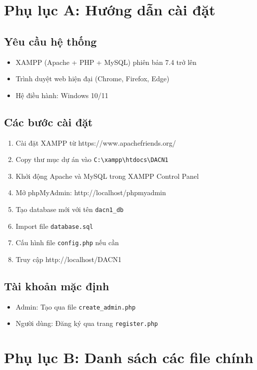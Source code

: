 \documentclass[a4paper,13pt]{extreport}
\begin{document}
\section*{Phụ lục A: Hướng dẫn cài đặt}

\subsection*{Yêu cầu hệ thống}
\begin{itemize}
    \item XAMPP (Apache + PHP + MySQL) phiên bản 7.4 trở lên
    \item Trình duyệt web hiện đại (Chrome, Firefox, Edge)
    \item Hệ điều hành: Windows 10/11
\end{itemize}

\subsection*{Các bước cài đặt}
\begin{enumerate}
    \item Cài đặt XAMPP từ https://www.apachefriends.org/
    \item Copy thư mục dự án vào \texttt{C:\textbackslash xampp\textbackslash htdocs\textbackslash DACN1}
    \item Khởi động Apache và MySQL trong XAMPP Control Panel
    \item Mở phpMyAdmin: http://localhost/phpmyadmin
    \item Tạo database mới với tên \texttt{dacn1\_db}
    \item Import file \texttt{database.sql}
    \item Cấu hình file \texttt{config.php} nếu cần
    \item Truy cập http://localhost/DACN1
\end{enumerate}

\subsection*{Tài khoản mặc định}
\begin{itemize}
    \item Admin: Tạo qua file \texttt{create\_admin.php}
    \item Người dùng: Đăng ký qua trang \texttt{register.php}
\end{itemize}

\section*{Phụ lục B: Danh sách các file chính}
\end{document}
